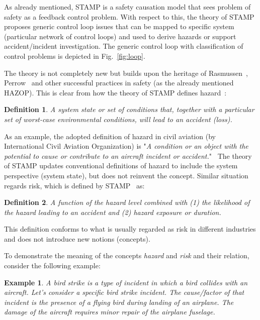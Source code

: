 \documentclass[sw]{iosart2x}
\newtheorem{mydef}{Definition}
\newtheorem{myexample}{Example}
\begin{document}
As already mentioned, STAMP is a safety causation model that sees problem of safety as a feedback control problem. With respect to this, the theory of STAMP proposes generic control loop issues that can be mapped to specific system (particular network of control loops) and used to derive hazards or support accident/incident investigation. The generic control loop with classification of control problems is depicted in Fig.~\ref{fig:loop}. 

The theory is not completely new but builds upon the heritage of Rasmussen~\cite{Rasmussen1997}, Perrow~\cite{Perrow1999} and other successful practices in safety (as the already mentioned HAZOP). This is clear from how the theory of STAMP defines hazard~\cite{leveson2012engineering}:
\begin{mydef}
\label{def:hazard}
A system state or set of conditions that, together with a particular set of worst-case environmental conditions, will lead to an accident (loss).
\end{mydef}
As an example, the adopted definition of hazard in civil aviation (by International Civil Aviation Organization) is "\emph{A condition or an object with the potential to cause or contribute to an aircraft incident or accident.}"~\cite{ICAO2018} The theory of STAMP updates conventional definitions of hazard to include the system perspective (system state), but does not reinvent the concept. Similar situation regards risk, which is defined by STAMP~\cite{leveson2012engineering} as:
\begin{mydef}
\label{def:risk}
A function of the hazard level combined with (1) the likelihood of the hazard leading to an accident and (2) hazard exposure or duration.
\end{mydef} 
This definition conforms to what is usually regarded as risk in different industries and does not introduce new notions (concepts). 

To demonstrate the meaning of the concepts \emph{hazard} and \emph{risk} and their relation, consider the following example: 

\begin{myexample}
\label{ex:birdstrike}
A bird strike is a type of incident in which a bird collides with an aircraft. 
Let's consider a specific bird strike incident. The cause/factor of that incident is the presence of a flying bird during landing of an airplane. The damage of the aircraft requires minor repair of the airplane fuselage.
\end{myexample}
\end{document}

